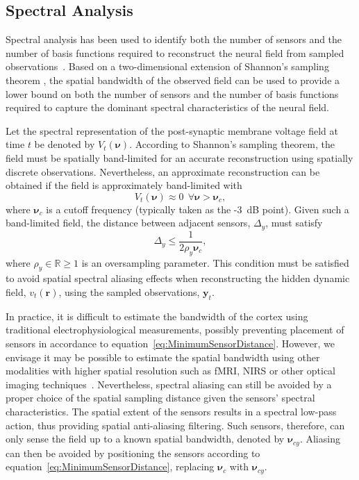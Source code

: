 \documentclass[12pt]{iopart}
\begin{document}
\subsection{Spectral Analysis}\label{SpectralAnalysisSection} 
Spectral analysis has been used to identify both the number of sensors and the number of basis functions required to reconstruct the neural field from sampled observations~\cite{Sanner1992,Scerri2009}. Based on a two-dimensional extension of Shannon's sampling theorem \cite{Peterson1962}, the spatial bandwidth of the observed field can be used to provide a lower bound on both the number of sensors and the number of basis functions required to capture the dominant spectral characteristics of the neural field.

Let the spectral representation of the post-synaptic membrane voltage field at time $t$ be denoted by $V_t(\boldsymbol{\nu})$. According to Shannon's sampling theorem, the field must be spatially band-limited for an accurate reconstruction using spatially discrete observations. Nevertheless, an approximate reconstruction can be obtained if the field is approximately band-limited with 
\begin{equation}
	V_t(\boldsymbol{\nu}) \approx 0 ~ \ \forall \boldsymbol{\nu} > \boldsymbol{\nu}_c,
\end{equation}
where $\boldsymbol{\nu}_c$ is a cutoff frequency (typically taken as the -3~dB point). Given such a band-limited field, the distance between adjacent sensors, $\Delta_y$, must satisfy 
\begin{equation}
	\label{eq:MinimumSensorDistance} \Delta_y \leq \frac{1}{2\rho_y\boldsymbol{\nu}_{c}}, 
\end{equation}
where $\rho_y \in \mathbb{R} \ge 1$ is an oversampling parameter. This condition must be satisfied to avoid spatial spectral aliasing effects when reconstructing the hidden dynamic field, $v_t(\mathbf{r})$, using the sampled observations, $\mathbf{y}_t$.

In practice, it is difficult to estimate the bandwidth of the cortex using traditional electrophysiological measurements, possibly preventing placement of sensors in accordance to equation~\ref{eq:MinimumSensorDistance}. However, we envisage it may be possible to estimate the spatial bandwidth using other modalities with higher spatial resolution such as fMRI, NIRS or other optical imaging techniques~\cite{Issa2000}. Nevertheless, spectral aliasing can still be avoided by a proper choice of the spatial sampling distance given the sensors' spectral characteristics. The spatial extent of the sensors results in a spectral low-pass action, thus providing spatial anti-aliasing filtering. Such sensors, therefore, can only sense the field up to a known spatial bandwidth, denoted by $\boldsymbol{\nu}_{cy}$. Aliasing can then be avoided by positioning the sensors according to equation~\ref{eq:MinimumSensorDistance}, replacing $\boldsymbol{\nu}_c$ with $\boldsymbol{\nu}_{cy}$.
\end{document}
